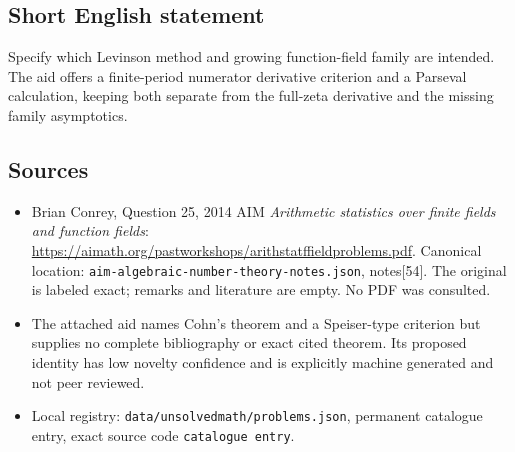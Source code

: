 \documentclass[11pt]{article}
\begin{document}
\subsection{Short English statement}
Specify which Levinson method and growing function-field family are intended. The aid offers a finite-period numerator derivative criterion and a Parseval calculation, keeping both separate from the full-zeta derivative and the missing family asymptotics.
\subsection{Sources}
\begin{itemize}
\item Brian Conrey, Question 25, 2014 AIM \emph{Arithmetic statistics over finite fields and function fields}: \url{https://aimath.org/pastworkshops/arithstatffieldproblems.pdf}. Canonical location: \texttt{aim-algebraic-number-theory-notes.json}, notes[54]. The original is labeled exact; remarks and literature are empty. No PDF was consulted.
\item The attached aid names Cohn's theorem and a Speiser-type criterion but supplies no complete bibliography or exact cited theorem. Its proposed identity has low novelty confidence and is explicitly machine generated and not peer reviewed.
\item Local registry: \texttt{data/unsolvedmath/problems.json}, permanent catalogue entry, exact source code \texttt{catalogue entry}.
\end{itemize}
\end{document}
